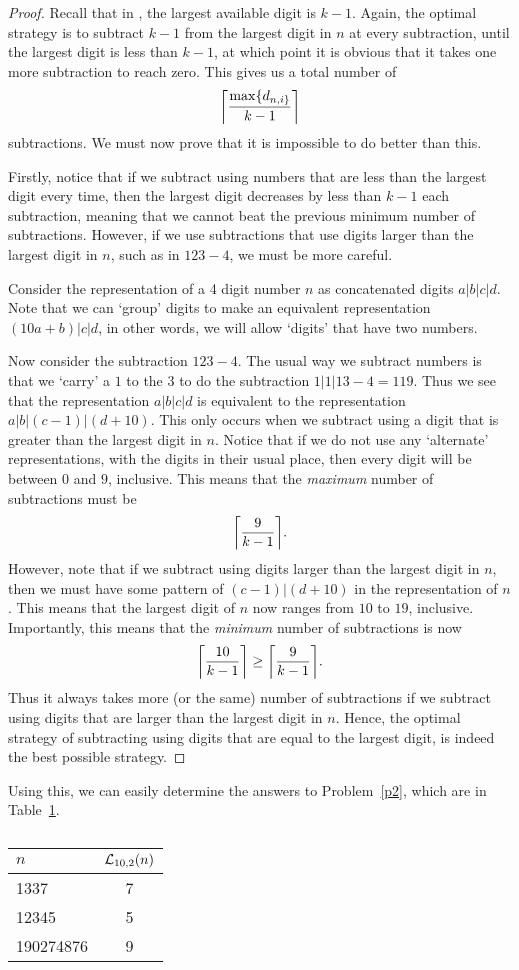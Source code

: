 \begin{proof}
  Recall that in \NTen{}, the largest available digit is $k-1$. Again, the optimal strategy is to subtract $k-1$ from the largest digit in $n$ at every subtraction, until the largest digit is less than $k-1$, at which point it is obvious that it takes one more subtraction to reach zero. This gives us a total number of \[
    \ceil*{\frac{\max\{d_{n, i\}}}{k-1}}
  \] subtractions. We must now prove that it is impossible to do better than this. 

  Firstly, notice that if we subtract using numbers that are less than the largest digit every time, then the largest digit decreases by less than $k-1 $ each subtraction, meaning that we cannot beat the previous minimum number of subtractions. However, if we use subtractions that use digits larger than the largest digit in $n$, such as in $123-4$, we must be more careful.

  Consider the representation of a 4 digit number $n$ as concatenated digits $a|b|c|d$. Note that we can `group' digits to make an equivalent representation $(10a + b)|c|d$, in other words, we will allow `digits' that have two numbers.

  Now consider the subtraction $123-4$. The usual way we subtract numbers is that we `carry' a $1$ to the $3$ to do the subtraction $1|1|13 - 4 = 119$. Thus we see that the representation $a|b|c|d$ is equivalent to the representation $a|b|(c-1)|(d+10)$. This only occurs when we subtract using a digit that is greater than the largest digit in $n$. Notice that if we do not use any `alternate' representations, with the digits in their usual place, then every digit will be between $0$ and $9$, inclusive. This means that the \emph{maximum} number of subtractions must be \[
    \ceil*{\frac{9}{k-1}}
  .\] However, note that if we subtract using digits larger than the largest digit in  $n$, then we must have some pattern of  $(c-1)|(d+10)$ in the representation of  $n$. This means that the largest digit of $n$ now ranges from $10$ to $19$, inclusive. Importantly, this means that the \emph{minimum} number of subtractions is now \[
  \ceil*{\frac{10}{k-1}} \ge \ceil*{\frac{9}{k-1}}
  .\] Thus it always takes more (or the same) number of subtractions if we subtract using digits that are larger than the largest digit in $n$. Hence, the optimal strategy of subtracting using digits that are equal to the largest digit, is indeed the best possible strategy.
\end{proof}
Using this, we can easily determine the answers to Problem~\ref{p2}, which are in Table~\ref{t1}.
\begin{table}[H]
  \centering
  \begin{tabular}{lc} \toprule
    $n$ & $\LTen(n)$ \\ \midrule
    1337 & 7 \\
    12345 & 5 \\
    190274876 & 9 \\ \bottomrule
  \end{tabular}
  \caption{}
  \label{t1}
\end{table}
